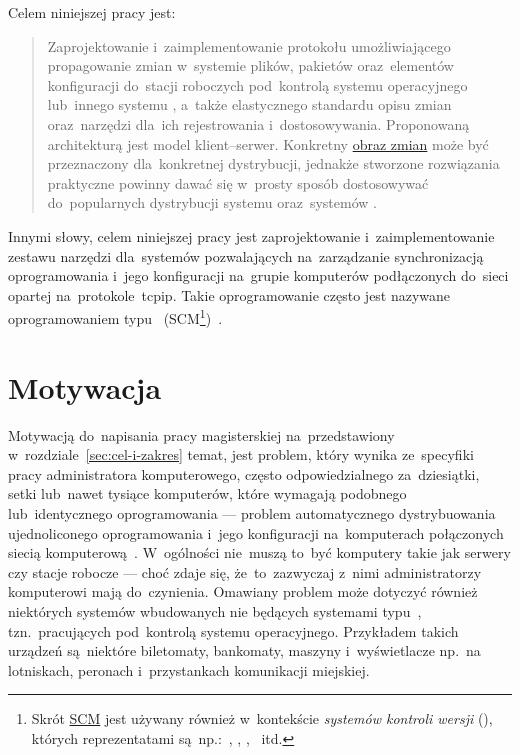 \documentclass[thesis]{subfiles}
\begin{document}
\noindent Celem niniejszej pracy jest:\mynobreakpar
\blockcquote{formularz-zgloszenia-pracy}{Zaprojektowanie i~zaimplementowanie protokołu umożliwiającego propagowanie zmian w~systemie plików, pakietów oraz~elementów konfiguracji do~stacji roboczych pod~kontrolą systemu operacyjnego  lub~innego systemu , a~także elastycznego standardu opisu zmian oraz~narzędzi dla~ich rejestrowania i~dostosowywania. Proponowaną architekturą jest model klient--serwer. Konkretny \hyperref[sec:obraz-zmian-konfiguracji]{obraz zmian} może być przeznaczony dla~konkretnej dystrybucji, jednakże stworzone rozwiązania praktyczne powinny dawać się w~prosty sposób dostosowywać do~popularnych dystrybucji systemu  oraz~systemów .}
Innymi słowy, celem niniejszej pracy jest zaprojektowanie i~zaimplementowanie zestawu narzędzi dla~systemów  pozwalających na~zarządzanie synchronizacją oprogramowania i~jego konfiguracji na~grupie komputerów podłączonych do~sieci opartej na~protokole~\gls{tcpip}. Takie oprogramowanie często jest nazywane oprogramowaniem typu ~(SCM\footnote{Skrót \href{https://en.wikipedia.org/wiki/SCM}{SCM} jest używany również w~kontekście \emph{systemów kontroli wersji} (), których reprezentatami są~np.:~, , , ~itd.})~\cite{wiki:scm}.


\section{Motywacja}

Motywacją do~napisania pracy magisterskiej na~przedstawiony w~rozdziale~\ref{sec:cel-i-zakres} temat, jest problem, który wynika ze~specyfiki pracy administratora komputerowego, często odpowiedzialnego za~dziesiątki, setki lub~nawet tysiące komputerów, które wymagają podobnego lub~identycznego oprogramowania --- problem automatycznego dystrybuowania ujednoliconego oprogramowania i~jego konfiguracji na~komputerach połączonych siecią komputerową~\cite{so-problem-intro}. W~ogólności nie~muszą to~być komputery takie jak serwery czy stacje robocze --- choć zdaje się, że~to~zazwyczaj z~nimi administratorzy komputerowi mają do~czynienia. Omawiany problem może dotyczyć również niektórych systemów wbudowanych nie będących systemami typu~\mbox{}, tzn.~pracujących pod~kontrolą systemu operacyjnego. Przykładem takich urządzeń są~niektóre biletomaty, bankomaty, maszyny  i~wyświetlacze np.~na lotniskach, peronach i~przystankach komunikacji miejskiej.
\end{document}
